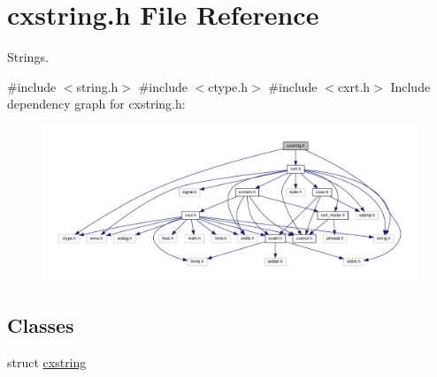 \hypertarget{a00026}{}\section{cxstring.\+h File Reference}
\label{a00026}


Strings.  


{\ttfamily \#include $<$string.\+h$>$}\newline
{\ttfamily \#include $<$ctype.\+h$>$}\newline
{\ttfamily \#include $<$cxrt.\+h$>$}\newline
Include dependency graph for cxstring.\+h\+:
\nopagebreak
\begin{figure}[H]
\begin{center}
\leavevmode
\includegraphics[width=350pt]{a00027}
\end{center}
\end{figure}
\subsection*{Classes}
\begin{DoxyCompactItemize}
\item 
struct \hyperlink{a00072}{cxstring}
\end{DoxyCompactItemize}
